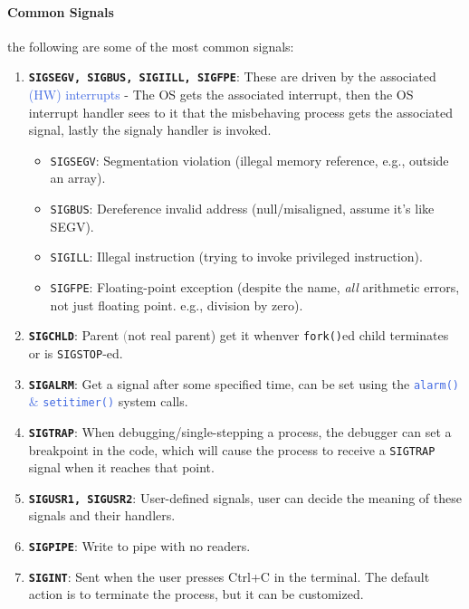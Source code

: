 \documentclass[openany,12pt]{book}
\newcommand{\code}[1]{\texttt{#1}}
\newcommand{\blue}[1]{\textcolor{RoyalBlue}{#1}}
\newcommand{\gray}[1]{\textcolor{gray}{#1}}
\begin{document}
\paragraph{Common Signals} the following are some of the most common signals:
\begin{enumerate}
    \item \textbf{\code{SIGSEGV, SIGBUS, SIGIILL, SIGFPE}}: These are driven by the associated \blue{(HW) interrupts} - The OS gets the associated interrupt, then the OS interrupt handler sees to it that the misbehaving process gets the associated signal, lastly the signaly handler is invoked.
          \begin{itemize}
              \item \texttt{SIGSEGV}: Segmentation violation (illegal memory reference, e.g., outside an array).
              \item \texttt{SIGBUS}: Dereference invalid address (null/misaligned, assume it's like SEGV).
              \item \texttt{SIGILL}: Illegal instruction (trying to invoke privileged instruction).
              \item \texttt{SIGFPE}: Floating-point exception (despite the name, \textit{all} arithmetic errors, not just floating point. e.g., division by zero).
          \end{itemize}

    \item \textbf{\code{SIGCHLD}}: Parent \gray(not real parent) get it whenver \code{fork()}ed child terminates or is \code{SIGSTOP}-ed.

    \item \textbf{\code{SIGALRM}}: Get a signal after some specified time, can be set using the \blue{\code{alarm()} \& \code{setitimer()}} system calls.

    \item \textbf{\code{SIGTRAP}}: When debugging/single-stepping a process, the debugger can set a breakpoint in the code, which will cause the process to receive a \texttt{SIGTRAP} signal when it reaches that point.

    \item \textbf{\code{SIGUSR1, SIGUSR2}}: User-defined signals, user can decide the meaning of these signals and their handlers.

    \item \textbf{\code{SIGPIPE}}: Write to pipe with no readers.

    \item \textbf{\code{SIGINT}}: Sent when the user presses Ctrl+C in the terminal. The default action is to terminate the process, but it can be customized.


\end{enumerate}
\end{document}
